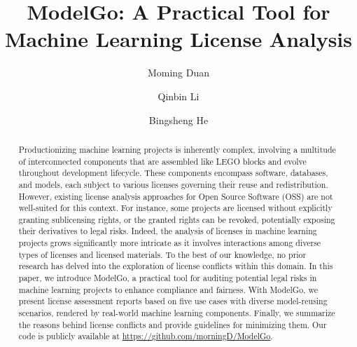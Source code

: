 \documentclass[sigconf]{acmart}
\begin{document}
\title{ModelGo: A Practical Tool for Machine Learning License Analysis}


\author{Moming Duan}


\author{Qinbin Li}

\author{Bingsheng He}

\renewcommand{\shortauthors}{Moming Duan, Qinbin Li, \& Bingsheng He}

\begin{abstract}
  Productionizing machine learning projects is inherently complex, involving a multitude of interconnected components that are assembled like LEGO blocks and evolve throughout development lifecycle.
  These components encompass software, databases, and models, each subject to various licenses governing their reuse and redistribution.
  However, existing license analysis approaches for Open Source Software (OSS) are not well-suited for this context.
  For instance, some projects are licensed without explicitly granting sublicensing rights, or the granted rights can be revoked, potentially exposing their derivatives to legal risks.
  Indeed, the analysis of licenses in machine learning projects grows significantly more intricate as it involves interactions among diverse types of licenses and licensed materials.
  To the best of our knowledge, no prior research has delved into the exploration of license conflicts within this domain.
  In this paper, we introduce ModelGo, a practical tool for auditing potential legal risks in machine learning projects to enhance compliance and fairness.
  With ModelGo, we present license assessment reports based on five use cases with diverse model-reusing scenarios, rendered by real-world machine learning components.
  Finally, we summarize the reasons behind license conflicts and provide guidelines for minimizing them.
  Our code is publicly available at \url{https://github.com/morningD/ModelGo}.
\end{abstract}
\end{document}
